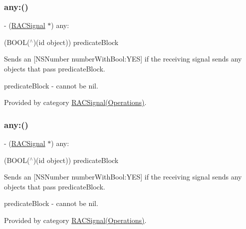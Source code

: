 \subsubsection{\texorpdfstring{any\+:()}{any:()}\hspace{0.1cm}{\footnotesize\ttfamily [2/3]}}
{\footnotesize\ttfamily -\/ (\mbox{\hyperlink{interface_r_a_c_signal}{R\+A\+C\+Signal}} $\ast$) any\+: \begin{DoxyParamCaption}\item[{(B\+O\+OL($^\wedge$)(id object))}]{predicate\+Block }\end{DoxyParamCaption}}

Sends an \mbox{[}N\+S\+Number number\+With\+Bool\+:Y\+ES\mbox{]} if the receiving signal sends any objects that pass {\ttfamily predicate\+Block}.

predicate\+Block -\/ cannot be nil. 

Provided by category \mbox{\hyperlink{category_r_a_c_signal_07_operations_08_a4bfb6af6556526457fbf0e5d3c878536}{R\+A\+C\+Signal(\+Operations)}}.

\mbox{\label{interface_r_a_c_signal_a4bfb6af6556526457fbf0e5d3c878536}} 
\subsubsection{\texorpdfstring{any\+:()}{any:()}\hspace{0.1cm}{\footnotesize\ttfamily [3/3]}}
{\footnotesize\ttfamily -\/ (\mbox{\hyperlink{interface_r_a_c_signal}{R\+A\+C\+Signal}} $\ast$) any\+: \begin{DoxyParamCaption}\item[{(B\+O\+OL($^\wedge$)(id object))}]{predicate\+Block }\end{DoxyParamCaption}}

Sends an \mbox{[}N\+S\+Number number\+With\+Bool\+:Y\+ES\mbox{]} if the receiving signal sends any objects that pass {\ttfamily predicate\+Block}.

predicate\+Block -\/ cannot be nil. 

Provided by category \mbox{\hyperlink{category_r_a_c_signal_07_operations_08_a4bfb6af6556526457fbf0e5d3c878536}{R\+A\+C\+Signal(\+Operations)}}.

\mbox{\label{interface_r_a_c_signal_a477114852c0e761a023a35e35ccc1784}} 
